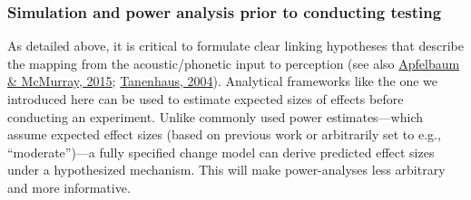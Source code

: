\documentclass[
  11pt,
  man,floatsintext]{apa6}
\begin{document}
\hypertarget{simulation-and-power-analysis-prior-to-conducting-testing}{%
\subsubsection{Simulation and power analysis prior to conducting testing}\label{simulation-and-power-analysis-prior-to-conducting-testing}}

As detailed above, it is critical to formulate clear linking hypotheses that describe the mapping from the acoustic/phonetic input to perception (see also \protect\hyperlink{ref-apfelbaum-mcmurray2015}{Apfelbaum \& McMurray, 2015}; \protect\hyperlink{ref-tanenhaus2004}{Tanenhaus, 2004}). Analytical frameworks like the one we introduced here can be used to estimate expected sizes of effects before conducting an experiment. Unlike commonly used power estimates---which assume expected effect sizes (based on previous work or arbitrarily set to e.g., ``moderate'')---a fully specified change model can derive predicted effect sizes under a hypothesized mechanism. This will make power-analyses less arbitrary and more informative.
\end{document}
